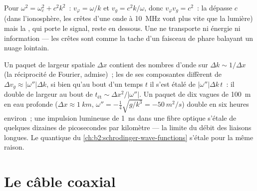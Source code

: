 \begin{example}\label{ex:b2:dispersion-wave-packets:superluminal}
Pour $\omega^2 = \omega_c^2 + c^2k^2$~: $v_\varphi = \omega/k$ et $v_g = c^2k/\omega$, donc
$v_\varphi v_g = c^2$~: la  dépasse $c$ (dans l'ionosphère, les crêtes
d'une onde à \qty{10}{MHz} vont plus vite que la lumière) mais la , qui porte le signal, reste en dessous. Une 
ne transporte ni énergie ni information --- les crêtes sont comme la
tache d'un faisceau de phare balayant un nuage lointain.
\end{example}

\begin{remark}[Étalement]\label{rem:b2:dispersion-wave-packets:spreading}
Un paquet de largeur spatiale $\Delta x$ contient des nombres d'onde sur $\Delta k \sim
1/\Delta x$ (la réciprocité de Fourier, admise)~; les  de ses
composantes diffèrent de $\Delta v_g \approx |\omega''|\Delta k$, si bien qu'au bout d'un temps $t$ il
s'est étalé de $|\omega''|\Delta k\,t$~: il double de largeur au bout de $t_{\text{ét}}
\sim \Delta x^2/|\omega''|$. Un paquet de dix vagues de \qty{100}{m} en eau profonde
($\Delta x \approx \qty{1}{km}$, $\omega'' = -\tfrac14\sqrt{g/k^3} = \qty{-50}{m^2/s}$)
double en six heures environ~; une impulsion lumineuse de \qty{1}{ns} dans une
fibre optique s'étale de quelques dizaines de picosecondes par kilomètre --- la
limite du débit des liaisons longues. Le  quantique du
\cref{ch:b2:schrodinger-wave-functions} s'étale pour la même raison.
\end{remark}

\section{Le câble coaxial}

